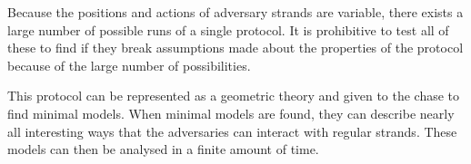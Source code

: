 		Because the positions and actions of adversary strands are variable,
		there exists a large number of possible runs of a single protocol. It
		is prohibitive to test all of these to find if they break assumptions
		made about the properties of the protocol because of the large number
		of possibilities.

		This protocol can be represented as a geometric theory and given to the
		chase to find minimal models. When minimal models are found, they can
		describe nearly all interesting ways that the adversaries can interact
		with regular strands. These models can then be analysed in a finite
		amount of time.
